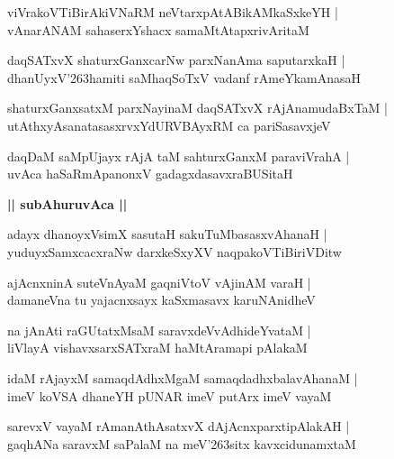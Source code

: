 \documentclass[twoside,12pt,openright]{book}
\def\S{\char'263}
\newcounter{shloka}[chapter]
\def\uvaca#1{\centerline{{\large\textbf{#1}}}}
\begin{document}
\begin{shloka}%
viVrakoVTiBirAkiVNaRM neVtarxpAtABikAMkaSxkeYH |\\
vAnarANAM sahaserxYshacx samaMtAtapxrivAritaM 
\end{shloka}

\begin{shloka}%
daqSATxvX shaturxGanxcarNw parxNanAma saputarxkaH |\\
dhanUyxV\S hamiti saMhaqSoTxV vadanf rAmeYkamAnasaH 
\end{shloka}

\begin{shloka}%
shaturxGanxsatxM parxNayinaM daqSATxvX rAjAnamudaBxTaM |\\
utAthxyAsanatasasxrvxYdURVBAyxRM ca pariSasavxjeV 
\end{shloka}

\begin{shloka}%
daqDaM saMpUjayx rAjA taM sahturxGanxM paraviVrahA |\\
uvAca haSaRmApanonxV gadagxdasavxraBUSitaH 
\end{shloka}

\uvaca{|| subAhuruvAca ||}

\begin{shloka}%
adayx dhanoyxVsimX sasutaH sakuTuMbasasxvAhanaH |\\
yuduyxSamxcacxraNw darxkeSxyXV naqpakoVTiBiriVDitw 
\end{shloka}

\begin{shloka}%
ajAcnxninA suteVnAyaM gaqniVtoV vAjinAM varaH |\\
damaneVna tu yajacnxsayx kaSxmasavx karuNAnidheV 
\end{shloka}

\begin{shloka}%
na jAnAti raGUtatxMsaM saravxdeVvAdhideYvataM |\\
liVlayA vishavxsarxSATxraM haMtAramapi pAlakaM 
\end{shloka}

\begin{shloka}%
idaM rAjayxM samaqdAdhxMgaM samaqdadhxbalavAhanaM |\\
imeV koVSA dhaneYH pUNAR imeV putArx imeV vayaM 
\end{shloka}

\begin{shloka}%
sarevxV vayaM rAmanAthAsatxvX dAjAcnxparxtipAlakAH |\\
gaqhANa saravxM saPalaM na meV\S sitx kavxcidunamxtaM 
\end{shloka}
\end{document}
